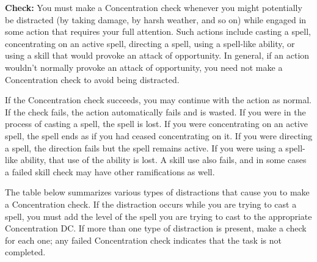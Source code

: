
\textbf{Check:} You must make a Concentration check whenever you might potentially be distracted (by taking damage, by harsh weather, and so on) while engaged in some action that requires your full attention. Such actions include casting a spell, concentrating on an active spell, directing a spell, using a spell-like ability, or using a skill that would provoke an attack of opportunity. In general, if an action wouldn't normally provoke an attack of opportunity, you need not make a Concentration check to avoid being distracted.

If the Concentration check succeeds, you may continue with the action as normal. If the check fails, the action automatically fails and is wasted. If you were in the process of casting a spell, the spell is lost. If you were concentrating on an active spell, the spell ends as if you had ceased concentrating on it. If you were directing a spell, the direction fails but the spell remains active. If you were using a spell-like ability, that use of the ability is lost. A skill use also fails, and in some cases a failed skill check may have other ramifications as well.

The table below summarizes various types of distractions that cause you to make a Concentration check. If the distraction occurs while you are trying to cast a spell, you must add the level of the spell you are trying to cast to the appropriate Concentration DC. If more than one type of distraction is present, make a check for each one; any failed Concentration check indicates that the task is not completed.

